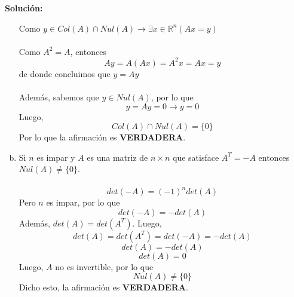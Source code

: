 \documentclass[12pt]{article}
\newenvironment{solucion}
{\begin{mdframed}[backgroundcolor=black!10]
		{\bf Solución:}\\
	}
	{
	\end{mdframed}
}
\newenvironment{preguntas}
{\begin{enumerate}\itemsep12pt
	}
	{
	\end{enumerate}
}
\newcommand{\ra}{\rightarrow}
\newcommand{\R}{\mathbb{R}}
\begin{document}
\begin{preguntas}
\begin{solucion}
\begin{enumerate}[a)]
			Como $y \in Col(A) \cap Nul(A) \ra \exists x \in \R^n (Ax = y)$\\
			\\
			Como $A^2 = A$, entonces
			$$Ay = A(Ax) = A^2x = Ax = y$$
			de donde concluimos que $y = Ay$\\
			\\
			Además, sabemos que $y \in Nul(A)$, por lo que
			$$y = Ay = 0 \ra y = 0$$
			Luego,
			$$Col(A) \cap Nul(A) = \{0\}$$
			Por lo que la afirmación es {\bf VERDADERA}.
\item Si $n$ es impar y $A$ es una matriz de $n\times n$ que satisface $A^T = -A$ entonces $Nul(A) \neq \{0\}$.\\
			\\
			$$det(-A) = (-1)^n det(A)$$
			Pero $n$ es impar, por lo que
			$$det(-A) = -det(A)$$
			Además, $det(A) = det(A^T)$. Luego,
			$$det(A) = det(A^T) = det(-A) = -det(A)$$
			$$det(A) = -det(A)$$
			$$det(A) = 0$$
			Luego, $A$ no es invertible, por lo que
			$$Nul(A) \neq \{0\}$$
			Dicho esto, la afirmación es {\bf VERDADERA}.
\end{enumerate}
\end{solucion}
\end{preguntas}
\end{document}

